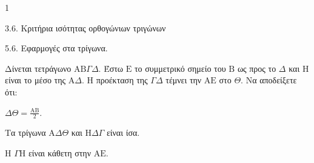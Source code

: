 \begin{ylh}{1}
    \item 3.6. Κριτήρια ισότητας ορθογώνιων τριγώνων
    \item 5.6. Εφαρμογές στα τρίγωνα.
\end{ylh}
Δίνεται τετράγωνο $\mathrm{A}\mathrm{B}\Gamma\Delta$. Έστω $\mathrm{E}$ το συμμετρικό σημείο του $\mathrm{B}$ ως προς το $\Delta$ και $\mathrm{H}$ είναι το μέσο της $\mathrm{A}\Delta$. Η προέκταση της $\Gamma\Delta$ τέμνει την $\mathrm{A}\mathrm{E}$ στο $\Theta$.
Να αποδείξετε ότι:
\begin{alist}
    \item $\Delta\Theta = \frac{\mathrm{A}\mathrm{B}}{2}$. 
    \item Τα τρίγωνα $\mathrm{A}\Delta\Theta$ και $\mathrm{H}\Delta\Gamma$ είναι ίσα. 
    \item Η $\Gamma\mathrm{H}$ είναι κάθετη στην $\mathrm{A}\mathrm{E}$. 
\end{alist}
